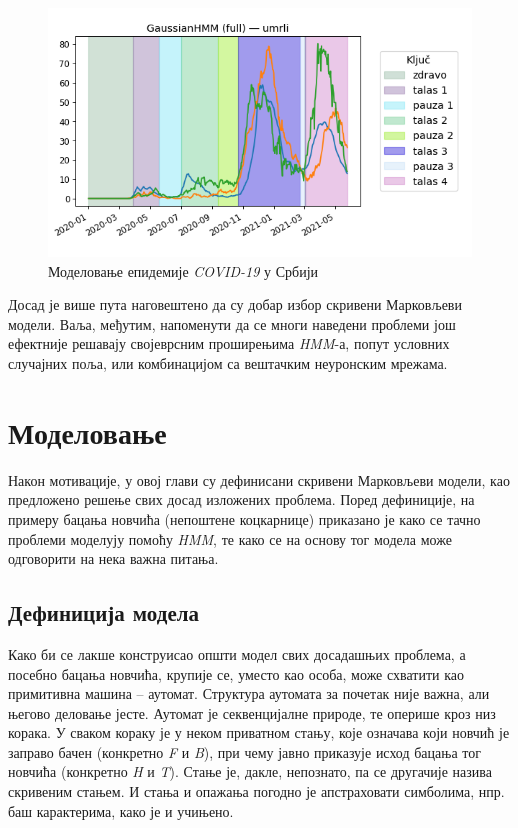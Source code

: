 \documentclass[12pt,oneside]{memoir}
\begin{document}
\begin{CJK}{UTF8}{ipxm}
\begin{figure}[H]
  \centering
  \includegraphics[width=.8\textwidth]{covid.png}
  \caption{Моделовање епидемије \textit{COVID-19} у Србији\cite{vasovic2021}}
  \label{fig:covid}
\end{figure}

Досад је више пута наговештено да су добар избор скривени Марковљеви модели. Ваља, међутим, напоменути да се многи наведени проблеми још ефектније решавају својеврсним проширењима \textit{HMM}-а, попут условних случајних поља\cite{ponomareva2007}, или комбинацијом са вештачким неуронским мрежама\cite{cohen1999}.

\chapter{Моделовање}
Након мотивације, у овој глави су дефинисани скривени Марковљеви модели, као предложено решење свих досад изложених проблема. Поред дефиниције, на примеру бацања новчића (непоштене коцкарнице) приказано је како се тачно проблеми моделују помоћу \textit{HMM}, те како се на основу тог модела може одговорити на нека важна питања.

\section{Дефиниција модела}
Како би се лакше конструисао општи модел свих досадашњих проблема, а посебно бацања новчића, крупије се, уместо као особа, може схватити као примитивна машина -- аутомат. Структура аутомата за почетак није важна, али његово деловање јесте. Аутомат је секвенцијалне природе, те оперише кроз низ корака. У сваком кораку је у неком приватном стању, које означава који новчић је заправо бачен (конкретно \textit{F} и \textit{B}), при чему јавно приказује исход бацања тог новчића (конкретно \textit{H} и \textit{T}). Стање је, дакле, непознато, па се другачије назива скривеним стањем. И стања и опажања погодно је апстраховати симболима, нпр. баш карактерима, како је и учињено.


\end{CJK}
\end{document}
